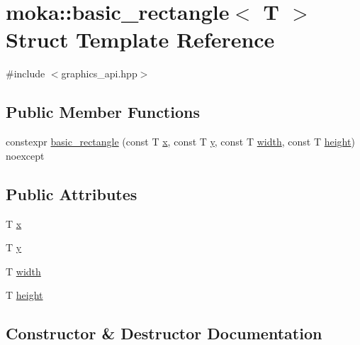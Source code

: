 \hypertarget{structmoka_1_1basic__rectangle}{}\section{moka\+::basic\+\_\+rectangle$<$ T $>$ Struct Template Reference}
\label{structmoka_1_1basic__rectangle}


{\ttfamily \#include $<$graphics\+\_\+api.\+hpp$>$}

\subsection*{Public Member Functions}
\begin{DoxyCompactItemize}
\item 
constexpr \mbox{\hyperlink{structmoka_1_1basic__rectangle_ade7e94994ab7b5248476783465611637}{basic\+\_\+rectangle}} (const T \mbox{\hyperlink{structmoka_1_1basic__rectangle_a8221be0d993b1022e581a8c68df1bfb3}{x}}, const T \mbox{\hyperlink{structmoka_1_1basic__rectangle_a5023ee863e872b98eb7e54bcabba857a}{y}}, const T \mbox{\hyperlink{structmoka_1_1basic__rectangle_a0ed8e9c98975c0198ba3b9952a541bcd}{width}}, const T \mbox{\hyperlink{structmoka_1_1basic__rectangle_ac773540b14150160608c2522029bbd37}{height}}) noexcept
\end{DoxyCompactItemize}
\subsection*{Public Attributes}
\begin{DoxyCompactItemize}
\item 
T \mbox{\hyperlink{structmoka_1_1basic__rectangle_a8221be0d993b1022e581a8c68df1bfb3}{x}}
\item 
T \mbox{\hyperlink{structmoka_1_1basic__rectangle_a5023ee863e872b98eb7e54bcabba857a}{y}}
\item 
T \mbox{\hyperlink{structmoka_1_1basic__rectangle_a0ed8e9c98975c0198ba3b9952a541bcd}{width}}
\item 
T \mbox{\hyperlink{structmoka_1_1basic__rectangle_ac773540b14150160608c2522029bbd37}{height}}
\end{DoxyCompactItemize}


\subsection{Constructor \& Destructor Documentation}
\mbox{\label{structmoka_1_1basic__rectangle_ade7e94994ab7b5248476783465611637}} 
